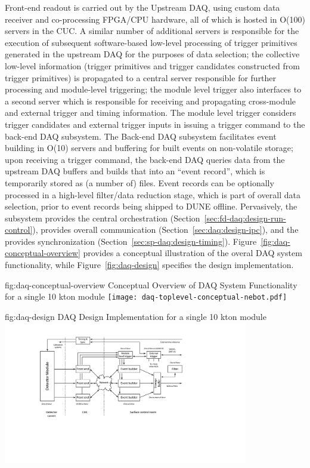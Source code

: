 Front-end readout is carried out by the Upstream DAQ, using custom data receiver and
co-processing FPGA/CPU hardware, all of which is hosted in O(100) servers in the CUC. A
similar number of additional servers is responsible for the execution
of subsequent software-based low-level processing of trigger primitives
generated in the upstream DAQ for the purposes of data selection; the collective
low-level information (trigger primitives and trigger candidates
constructed from trigger primitives) is propagated to a central server responsible
for further processing and module-level triggering; the module level
trigger also
interfaces to a second server which is responsible for receiving and
propagating cross-module and external trigger and timing
information. The module level trigger considers trigger candidates and
external trigger inputs in issuing a trigger command to the back-end DAQ
subsystem. The Back-end DAQ subsystem 
facilitates event building in O(10) servers and buffering for built
events on non-volatile storage; upon receiving a trigger command, the back-end DAQ queries
data from the upstream DAQ buffers and builds that into an ``event
record'', which is temporarily stored as (a number of) files. Event records can be optionally processed in a high-level
filter/data reduction stage, which is part of overall data selection,
 prior to event records being shipped to DUNE offline. Pervasively,
 the   subsystem provides the central orchestration
 (Section~\ref{sec:fd-daq:design-run-control}),  provides
 overall communication (Section~\ref{sec:daq:design-ipc}), and the
  provides synchronization
 (Section~\ref{sec:sp-daq:design-timing}). Figure~\ref{fig:daq-conceptual-overview}
 provides a conceptual illustration of the overal DAQ system
 functionality, while Figure~\ref{fig:daq-design}
specifies the design implementation. 

\begin{dunefigure}{fig:daq-conceptual-overview}{ Conceptual
   Overview of DAQ System Functionality for a single 10 kton module}
  \texttt{[image: daq-toplevel-conceptual-nebot.pdf]}
\end{dunefigure}

\begin{dunefigure}{fig:daq-design}{ DAQ Design
    Implementation for a single 10 kton module}
  \includegraphics[width=0.8\textwidth]{daq-overview.pdf}
\end{dunefigure}

